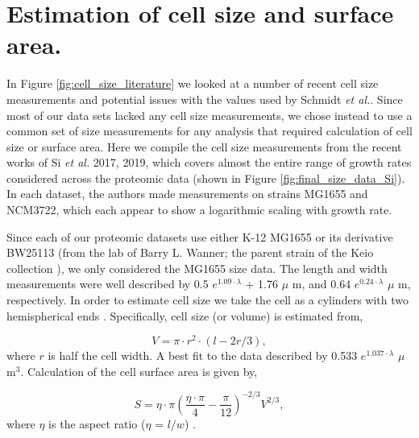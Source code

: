 \section{Estimation of cell size and surface area.}

In Figure \ref{fig:cell_size_literature} we looked at a number of recent cell
size measurements and potential issues with the values used by Schmidt
\textit{et al.}. Since most of our data sets lacked any cell size measurements,
we chose instead to use a common set of size measurements for any analysis
that required calculation of cell size or surface area. Here we compile the
cell size measurements from the recent works of Si \textit{et al.} 2017, 2019,
which covers almost the entire range of growth rates considered across the
proteomic data (shown in Figure \ref{fig:final_size_data_Si}). In each dataset,
the authors made measurements on strains MG1655 and NCM3722, which each appear
to show a logarithmic scaling with growth rate.

Since each of our proteomic datasets use either K-12 MG1655 or its derivative
BW25113 (from the lab of Barry L. Wanner; the parent strain of the Keio
collection \citep{datsenko2000, baba2006}), we only considered the MG1655 size
data. The length and width measurements  were well described by 0.5 $e^{1.09
\cdot \lambda}$ + 1.76 $\mu$ m, and 0.64 $e^{0.24 \cdot \lambda}$ $\mu$ m,
respectively. In order to estimate cell size we take the cell as a cylinders
with two hemispherical ends \citep{si2017, basan2015}. Specifically,  cell size
(or volume) is estimated from,

\begin{equation}
V = \pi \cdot r^2 \cdot (l - 2r/3),
\label{eq:cell_size}
\end{equation}
where $r$ is half the cell width. A best fit to the data described by 0.533
$e^{1.037 \cdot \lambda}$ $\mu$ m$^3$. Calculation of the cell surface area is
given by,

\begin{equation}
 S = \eta \cdot \pi (\frac{\eta \cdot \pi}{4} - \frac{\pi}{12})^{-2/3} V^{2/3},
\end{equation}
where $\eta$ is the aspect ratio ($\eta$ = $l/w$) \citep{ojkic2019}.

